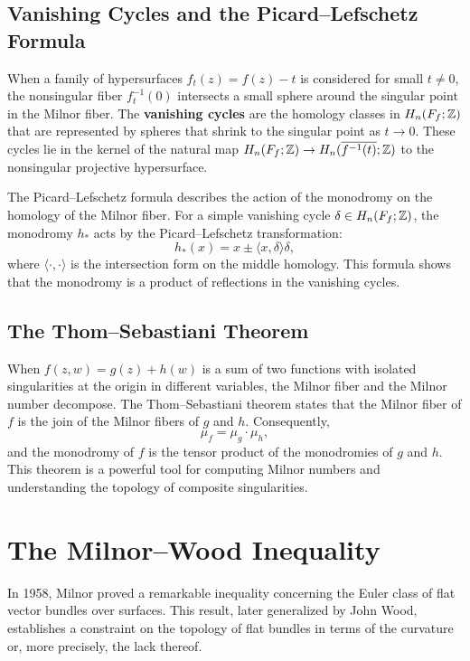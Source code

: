\subsection{Vanishing Cycles and the Picard--Lefschetz Formula}

When a family of hypersurfaces \(f_t(z) = f(z) - t\) is considered for small \(t \neq 0\), the nonsingular fiber \(f_t^{-1}(0)\) intersects a small sphere around the singular point in the Milnor fiber. The \textbf{vanishing cycles} are the homology classes in \(H_n(F_f; \mathbb{Z})\) that are represented by spheres that shrink to the singular point as \(t \to 0\). These cycles lie in the kernel of the natural map \(H_n(F_f; \mathbb{Z}) \to H_n(\overline{f^{-1}(t)}; \mathbb{Z})\) to the nonsingular projective hypersurface.

The Picard--Lefschetz formula describes the action of the monodromy on the homology of the Milnor fiber. For a simple vanishing cycle \(\delta \in H_n(F_f; \mathbb{Z})\), the monodromy \(h_*\) acts by the Picard--Lefschetz transformation:
\[
h_*(x) = x \pm \langle x, \delta \rangle \delta,
\]
where \(\langle \cdot, \cdot \rangle\) is the intersection form on the middle homology. This formula shows that the monodromy is a product of reflections in the vanishing cycles.

\subsection{The Thom--Sebastiani Theorem}

When \(f(z,w) = g(z) + h(w)\) is a sum of two functions with isolated singularities at the origin in different variables, the Milnor fiber and the Milnor number decompose. The Thom--Sebastiani theorem states that the Milnor fiber of \(f\) is the join of the Milnor fibers of \(g\) and \(h\). Consequently,
\[
\mu_f = \mu_g \cdot \mu_h,
\]
and the monodromy of \(f\) is the tensor product of the monodromies of \(g\) and \(h\). This theorem is a powerful tool for computing Milnor numbers and understanding the topology of composite singularities.

\section{The Milnor--Wood Inequality}

In 1958, Milnor proved a remarkable inequality concerning the Euler class of flat vector bundles over surfaces. This result, later generalized by John Wood, establishes a constraint on the topology of flat bundles in terms of the curvature or, more precisely, the lack thereof.


